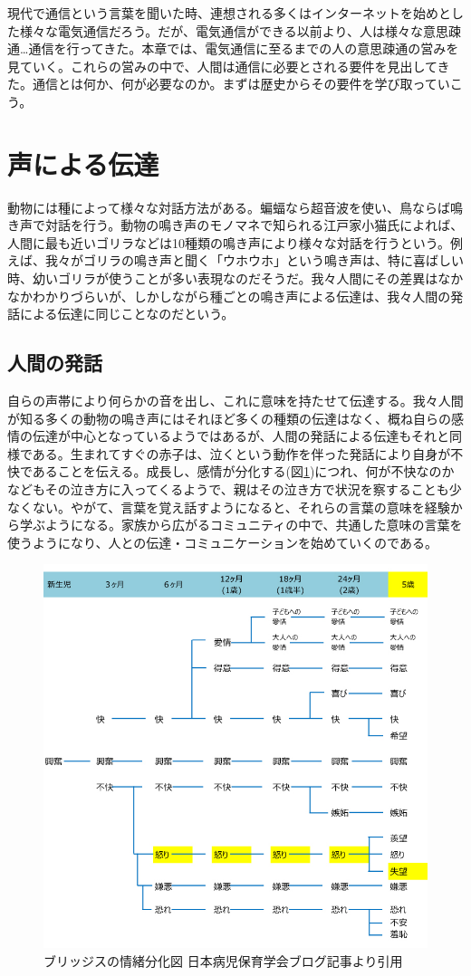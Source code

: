 現代で通信という言葉を聞いた時、連想される多くはインターネットを始めとした様々な電気通信だろう。だが、電気通信ができる以前より、人は様々な意思疎通…通信を行ってきた。本章では、電気通信に至るまでの人の意思疎通の営みを見ていく。これらの営みの中で、人間は通信に必要とされる要件を見出してきた。通信とは何か、何が必要なのか。まずは歴史からその要件を学び取っていこう。

\section{声による伝達}

動物には種によって様々な対話方法がある。蝙蝠なら超音波を使い、鳥ならば鳴き声で対話を行う。動物の鳴き声のモノマネで知られる江戸家小猫氏によれば、人間に最も近いゴリラなどは10種類の鳴き声により様々な対話を行うという。例えば、我々がゴリラの鳴き声と聞く「ウホウホ」という鳴き声は、特に喜ばしい時、幼いゴリラが使うことが多い表現なのだそうだ。我々人間にその差異はなかなかわかりづらいが、しかしながら種ごとの鳴き声による伝達は、我々人間の発話による伝達に同じことなのだという。

\subsection{人間の発話}

自らの声帯により何らかの音を出し、これに意味を持たせて伝達する。我々人間が知る多くの動物の鳴き声にはそれほど多くの種類の伝達はなく、概ね自らの感情の伝達が中心となっているようではあるが、人間の発話による伝達もそれと同様である。生まれてすぐの赤子は、泣くという動作を伴った発話により自身が不快であることを伝える。成長し、感情が分化する(図\ref{fig0_1})につれ、何が不快なのかなどもその泣き方に入ってくるようで、親はその泣き方で状況を察することも少なくない。やがて、言葉を覚え話すようになると、それらの言葉の意味を経験から学ぶようになる。家族から広がるコミュニティの中で、共通した意味の言葉を使うようになり、人との伝達・コミュニケーションを始めていくのである。

\begin{figure}[htbp]
\centering
\includegraphics[width=0.6\linewidth,keepaspectratio,bb=0 0 750 750]{fig/fig0_1.jpg}
\caption{ブリッジスの情緒分化図 日本病児保育学会ブログ記事より引用}\label{fig0_1}
\end{figure}

